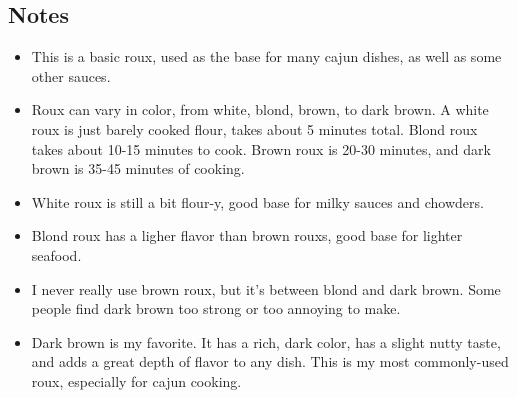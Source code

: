 \begin{multicols}{2}
\subsection*{Notes}
\begin{itemize}
    \item This is a basic roux, used as the base for many cajun dishes, as well as some other sauces.
    \item Roux can vary in color, from white, blond, brown, to dark brown. A white roux is just barely cooked flour, takes about 5 minutes total. Blond roux takes about 10-15 minutes to cook. Brown roux is 20-30 minutes, and dark brown is 35-45 minutes of cooking.
    \item White roux is still a bit flour-y, good base for milky sauces and chowders.
    \item Blond roux has a ligher flavor than brown rouxs, good base for lighter seafood.
    \item I never really use brown roux, but it's between blond and dark brown. Some people find dark brown too strong or too annoying to make.
    \item Dark brown is my favorite. It has a rich, dark color, has a slight nutty taste, and adds a great depth of flavor to any dish. This is my most commonly-used roux, especially for cajun cooking.
\end{itemize}
\end{multicols}
\clearpage